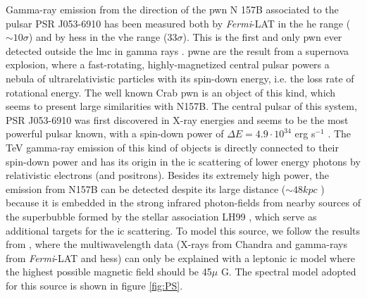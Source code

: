 \documentclass[main.tex]{subfiles}
\begin{document}
Gamma-ray emission from the direction of the \gls{pwn} N 157B associated to the pulsar  PSR J053-6910 has been measured both by \textit{Fermi}-LAT in the \gls{he} range ($\sim 10 \sigma$) and by \gls{hess} in the \gls{vhe} range ($33 \sigma$). This is the first and only \gls{pwn} ever detected outside the \gls{lmc} in gamma rays \cite{2012HESSN157B}. \gls{pwne} are the result from  a supernova explosion, where a fast-rotating, highly-magnetized central pulsar powers a nebula of ultrarelativistic particles with its spin-down energy, i.e. the loss rate of rotational energy. The well known Crab \gls{pwn} is an object of this kind, which seems to present large similarities with N157B. The central pulsar of this system, PSR J053-6910 was first discovered in X-ray energies and seems to be the most powerful pulsar known, with a spin-down power of $\Delta E = 4.9 \cdot 10^{34} $ erg s$^{-1}$ \cite{1998PulsarN157B}. The TeV gamma-ray emission of this kind of objects is directly connected to their spin-down power and has its origin in the \gls{ic} scattering of lower energy photons by relativistic electrons (and positrons). Besides its extremely high power, the emission from N157B can be detected despite its large distance ($\sim 48 kpc$ \cite{2006N157Bdistance}) because it is embedded in the strong infrared photon-fields from nearby sources of the superbubble formed by the stellar association LH99 \cite{}, which serve as additional targets for the \gls{ic} scattering.
To model this source, we follow the results from \cite{2015HESSTeVLMC}, where the multiwavelength data (X-rays from Chandra \cite{2001ChandraN157B} and gamma-rays from \textit{Fermi}-LAT and \gls{hess}) can only be explained with a leptonic \gls{ic} model where the highest possible magnetic field should be 45$\mu$ G. The  spectral model adopted for this source is shown in figure \ref{fig:PS}.
\end{document}
